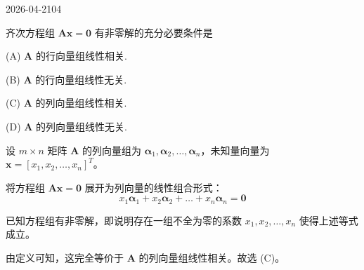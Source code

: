 \begin{mistake}{2026-04-21}{04}

\begin{problemcontent}
齐次方程组 \(\mathbf{Ax} = \mathbf{0}\) 有非零解的充分必要条件是

(A) \(\mathbf{A}\) 的行向量组线性相关.

(B) \(\mathbf{A}\) 的行向量组线性无关.

(C) \(\mathbf{A}\) 的列向量组线性相关.

(D) \(\mathbf{A}\) 的列向量组线性无关.
\end{problemcontent}

\begin{solutioncontent}
设 \(m \times n\) 矩阵 \(\mathbf{A}\) 的列向量组为 \(\boldsymbol{\alpha}_1, \boldsymbol{\alpha}_2, \dots, \boldsymbol{\alpha}_n\)，未知量向量为 \(\mathbf{x} = [x_1, x_2, \dots, x_n]^T\)。

将方程组 \(\mathbf{Ax} = \mathbf{0}\) 展开为列向量的线性组合形式：
\[
x_1\boldsymbol{\alpha}_1 + x_2\boldsymbol{\alpha}_2 + \dots + x_n\boldsymbol{\alpha}_n = \mathbf{0}
\]

已知方程组有非零解，即说明存在一组不全为零的系数 \(x_1, x_2, \dots, x_n\) 使得上述等式成立。

由定义可知，这完全等价于 \(\mathbf{A}\) 的列向量组线性相关。故选 (C)。
\end{solutioncontent}


\end{mistake}
